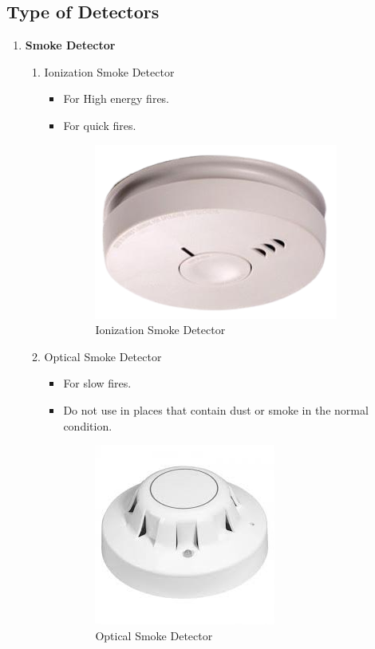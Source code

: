 \documentclass[12pt,fleqn]{book} %
\begin{document}
\subsection{Type of Detectors}
\begin{enumerate}
    \item \textbf{Smoke Detector}
    \begin{enumerate}
        \item Ionization Smoke Detector
        \begin{itemize}
        \item For High energy fires.
        \item For quick fires.
        \begin{figure}[h!]
    \centering
    \includegraphics[width=0.5\linewidth]{hamdy 16.png}
    \caption{Ionization Smoke Detector}
    \label{fig:hamdy 16}
\end{figure} 
    \end{itemize}
        \item Optical Smoke Detector
      \begin{itemize}
        \item For slow fires.
        \item Do not use in places that contain dust or smoke in the normal condition.
\begin{figure}[h!]
    \centering
    \includegraphics[width=0.5\linewidth]{hamdy 17.png}
    \caption{Optical Smoke Detector}

\end{figure}
\end{itemize}
\end{enumerate}
\end{enumerate}
\end{document}
